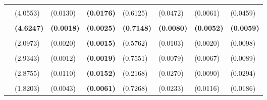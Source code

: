 \documentclass[
  12pt,
]{article}
\begin{document}
\begin{table}[H]
{\begin{tabular}[t]{lll>{}lllll}
\addlinespace
\cellcolor{gray!6}{c.bn6} & \cellcolor{gray!6}{-101.2737} & \cellcolor{gray!6}{0.6693} & \textbf{\cellcolor{gray!6}{0.5935}} & \cellcolor{gray!6}{0.3956} & \cellcolor{gray!6}{0.4611} & \cellcolor{gray!6}{0.3250} & \cellcolor{gray!6}{0.3203}\\
 & (4.0553) & (0.0130) & \textbf{(0.0176)} & (0.6125) & (0.0472) & (0.0061) & (0.0459)\\
\addlinespace
\textbf{\cellcolor{gray!6}{BIS Basel gap}} & \textbf{\cellcolor{gray!6}{-110.9026}} & \textbf{\cellcolor{gray!6}{0.6707}} & \textbf{\textbf{\cellcolor{gray!6}{0.5932}}} & \textbf{\cellcolor{gray!6}{3.3012}} & \textbf{\cellcolor{gray!6}{0.4490}} & \textbf{\cellcolor{gray!6}{0.3250}} & \textbf{\cellcolor{gray!6}{0.3073}}\\
\textbf{} & \textbf{(4.6247)} & \textbf{(0.0018)} & \textbf{\textbf{(0.0025)}} & \textbf{(0.7148)} & \textbf{(0.0080)} & \textbf{(0.0052)} & \textbf{(0.0059)}\\
\addlinespace
\cellcolor{gray!6}{c.hp221k} & \cellcolor{gray!6}{-100.8887} & \cellcolor{gray!6}{0.6632} & \textbf{\cellcolor{gray!6}{0.5908}} & \cellcolor{gray!6}{3.4199} & \cellcolor{gray!6}{0.4530} & \cellcolor{gray!6}{0.3292} & \cellcolor{gray!6}{0.3137}\\
 & (2.0973) & (0.0020) & \textbf{(0.0015)} & (0.5762) & (0.0103) & (0.0020) & (0.0098)\\
\addlinespace
\cellcolor{gray!6}{c.hp125k} & \cellcolor{gray!6}{-88.2934} & \cellcolor{gray!6}{0.6540} & \textbf{\cellcolor{gray!6}{0.5905}} & \cellcolor{gray!6}{2.4639} & \cellcolor{gray!6}{0.4691} & \cellcolor{gray!6}{0.3236} & \cellcolor{gray!6}{0.3248}\\
 & (2.9343) & (0.0012) & \textbf{(0.0019)} & (0.7551) & (0.0079) & (0.0067) & (0.0089)\\
\addlinespace
\cellcolor{gray!6}{c.bn2.r15} & \cellcolor{gray!6}{-47.5774} & \cellcolor{gray!6}{0.6637} & \textbf{\cellcolor{gray!6}{0.5901}} & \cellcolor{gray!6}{0.1127} & \cellcolor{gray!6}{0.5010} & \cellcolor{gray!6}{0.3212} & \cellcolor{gray!6}{0.3550}\\
 & (2.8755) & (0.0110) & \textbf{(0.0152)} & (0.2168) & (0.0270) & (0.0090) & (0.0294)\\
\addlinespace
\cellcolor{gray!6}{c.bn4} & \cellcolor{gray!6}{-143.6399} & \cellcolor{gray!6}{0.6835} & \textbf{\cellcolor{gray!6}{0.5889}} & \cellcolor{gray!6}{0.9797} & \cellcolor{gray!6}{0.4146} & \cellcolor{gray!6}{0.3236} & \cellcolor{gray!6}{0.2772}\\
 & (1.8203) & (0.0043) & \textbf{(0.0061)} & (0.7268) & (0.0233) & (0.0116) & (0.0186)\\

\end{tabular}}
\end{table}
\end{document}
